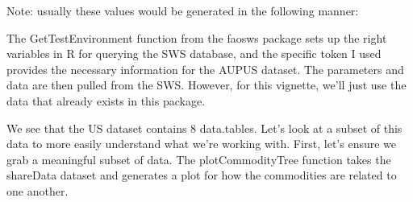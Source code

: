 \documentclass[nojss]{jss}
\begin{document}
Note: usually these values would be generated in the following manner:

\begin{knitrout}
\color{fgcolor}\begin{kframe}
\begin{alltt}
\hlstd{(}
     \hlstd{=} \hlstd{,}
     \hlstd{=} \hlstd{)}
 \hlkwb{=} \hlstd{(} \hlstd{=} \hlstd{,}  \hlstd{=} \hlstd{,}
                                  \hlstd{=} \hlopt{:}\hlstd{)}
 \hlkwb{=} \hlstd{(} 
\end{alltt}
\end{kframe}
\end{knitrout}

The GetTestEnvironment function from the faosws package sets up the right
variables in R for querying the SWS database, and the specific token I used
provides the necessary information for the AUPUS dataset.  The parameters and
data are then pulled from the SWS.  However, for this vignette, we'll just use
the data that already exists in this package.

We see that the US dataset contains 8 data.tables.  Let's look at a subset of
this data to more easily understand what we're working with.  First, let's
ensure we grab a meaningful subset of data.  The plotCommodityTree function
takes the shareData dataset and generates a plot for how the commodities are
related to one another.
\end{document}
